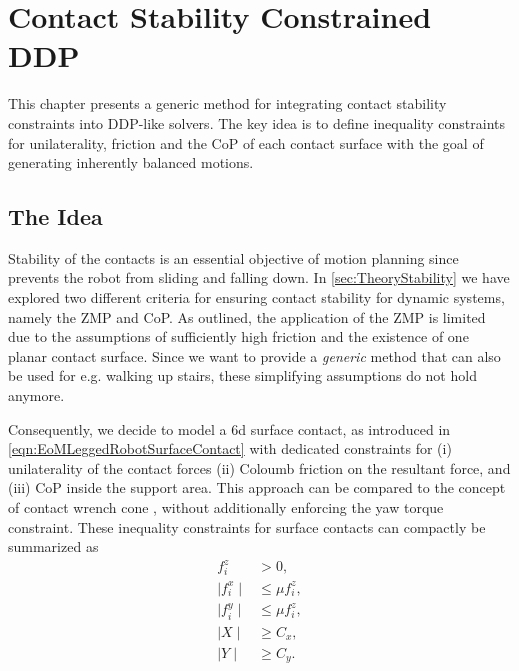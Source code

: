 
\chapter{Contact Stability Constrained DDP}\label{c3}
This chapter presents a generic method for integrating contact stability constraints into DDP-like solvers. The key idea is to define inequality constraints for unilaterality, friction and the \gls{CoP} of each contact surface with the goal of generating inherently balanced motions.

\section{The Idea}
Stability of the contacts is an essential objective of motion planning since prevents the robot from sliding and falling down. In \cref{sec:TheoryStability} we have explored two different criteria for ensuring contact stability for dynamic systems, namely the \gls{ZMP} and \gls{CoP}. As outlined, the application of the \gls{ZMP} is limited due to the assumptions of sufficiently high friction and the existence of one planar contact surface. Since we want to provide a \textit{generic} method that can also be used for e.g. walking up stairs, these simplifying assumptions do not hold anymore. 

Consequently, we decide to model a 6d surface contact, as introduced in \ref{eqn:EoMLeggedRobotSurfaceContact} with dedicated constraints for (i) unilaterality of the contact forces (ii) Coloumb friction on the resultant force, and (iii) \gls{CoP} inside the support area. This approach can be compared to the concept of contact wrench cone \cite{caron2015stability}, without additionally enforcing the yaw torque constraint. These inequality constraints for surface contacts can compactly be summarized as
\begin{subequations}\label{eqn:contractWrenchConeReduced}
\begin{align}
f_i^z &> 0 \label{subeqn:stabilityUnilaterality},\\
\mid f_i^x\mid &\leq \mu f_i^z \label{subeqn:stabilityFrictionX},\\
\mid f_i^y\mid &\leq \mu f_i^z \label{subeqn:stabilityFrictionY},\\
\mid X\mid & \geq C_x \label{subeqn:stabilityCoPPitch},\\
\mid Y\mid & \geq C_y \label{subeqn:stabilityCoPRoll}.
\end{align}
\end{subequations}

